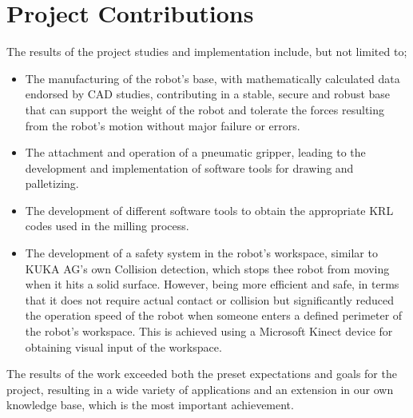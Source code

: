 \section{Project Contributions}
The results of the project studies and implementation include, but not limited to; 
\begin{itemize}
	\item The manufacturing of the robot’s base, with mathematically calculated data endorsed by CAD studies, contributing in a stable, secure and robust base that can support the weight of the robot and tolerate the forces resulting from the robot’s motion without major failure or errors.
	\item The attachment and operation of a pneumatic gripper, leading to the development and implementation of software tools for drawing and palletizing.
	\item The development of different software tools to obtain the appropriate KRL codes used in the milling process.
	\item The development of a safety system in the robot’s workspace, similar to KUKA AG’s own Collision detection, which stops thee robot from moving when it hits a solid surface. However, being more efficient and safe, in terms that it does not require actual contact or collision but significantly reduced the operation speed of the robot when someone enters a defined perimeter of the robot’s workspace. This is achieved using a Microsoft Kinect device for obtaining visual input of the workspace.
\end{itemize}

The results of the work exceeded both the preset expectations and goals for the project, resulting in a wide variety of applications and an extension in our own knowledge base, which is the most important achievement. 
